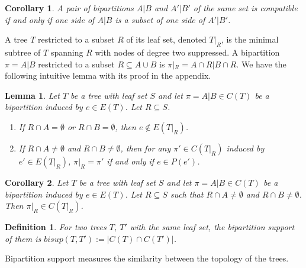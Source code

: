\documentclass{article}
\newcommand{\bs}{bisup}
\newtheorem{lemma}{Lemma}
\newtheorem{corollary}{Corollary}
\newtheorem{definition}{Definition}
\begin{document}
\begin{corollary}\label{cor:compatibility}
     A pair of bipartitions $A|B$ and $A'|B'$ of the same set is compatible if and only if one side of $A|B$ is a subset of one side of $A'|B'$.
\end{corollary}
\medskip

A tree $T$ restricted to a subset $R$ of its leaf set, denoted $T|_R$, is the minimal subtree of $T$ spanning $R$ with nodes of degree two suppressed. A bipartition $\pi = A|B$ restricted to a subset $R \subseteq A\cup B$ is $\pi|_R = A\cap R | B\cap R$. We have the following intuitive lemma with its proof in the appendix.

\begin{lemma} \label{lem:bipar_restrict_edge}
    Let $T$ be a tree with leaf set $S$ and let $\pi = A|B \in C(T)$ be a bipartition induced by $e \in E(T)$. Let $R \subseteq S$.
    \begin{enumerate}
        \item If $R \cap A = \emptyset$ or $R \cap B = \emptyset$, then $e \notin E(T|_R)$.
        \item If $R \cap A \neq \emptyset$ and $R \cap B \neq \emptyset$, then for any $\pi' \in C(T|_R)$ induced by $e' \in E(T|_R)$, $\pi|_R = \pi'$ if and only if $e \in P(e')$.
    \end{enumerate}
\end{lemma}

\begin{corollary} \label{cor:bipar_restrict}
    Let $T$ be a tree with leaf set $S$ and let $\pi = A|B \in C(T)$ be a bipartition induced by $e \in E(T)$. Let $R \subseteq S$ such that $R \cap A \neq \emptyset$ and $R \cap B \neq \emptyset$. Then $\pi|_R \in C(T|_R)$. 
\end{corollary}


\begin{definition}
For two trees $T$, $T'$ with the same leaf set, the \textit{bipartition support} of them is $\bs(T, T') := |C(T) \cap C(T')|$.
\end{definition}

Bipartition support measures the similarity between the topology of the trees.\\
\end{document}
